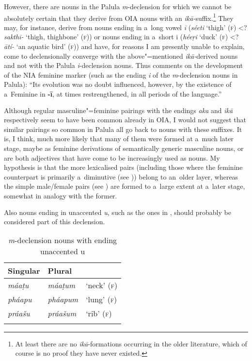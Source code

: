 However, there are nouns in the Palula \textit{m}-declension for which we cannot be absolutely
certain that they derive from OIA nouns with an \textit{ikā-}suffix.\footnote{At least there are
  no \textit{ikā}-formations occurring in the older literature, which of course is no proof
  they have never existed.} They may, for instance, derive from nouns ending in a~long vowel
\textit{ī} (\textit{séeti} `thigh' (\textsc{f}) {\textless}? \textit{sakthī-} `thigh, thighbone' (\textsc{f})) or nouns ending in a~short i (\textit{héeṛi} `duck'
(\textsc{f}) {\textless}? \textit{ātí-} `an aquatic bird' (\textsc{f})) and have, for
reasons I am presently unable to explain, come to declensionally converge with the above"=mentioned
\textit{ikā-}derived nouns and not with the Palula \textit{i}-declension nouns. Thus
\citet[222]{masica1991} comments on the development of the NIA feminine marker (such as the ending
\textit{i} of the \textit{m}-declension nouns in Palula): ``Its evolution was no doubt influenced,
however, by the existence of a~Feminine in \textbf{-ī}, at times
restrengthened, in all periods of the language.''


Although regular masculine"=feminine pairings with the endings \textit{aka} and \textit{ikā}
respectively seem to have been common already in OIA, I would not suggest that similar pairings so
common in Palula all go back to nouns with these suffixes. It is, I think, much more likely that
many of them were formed at a~much later stage, maybe as feminine derivations of semantically
generic masculine nouns, or are both adjectives that have come to be increasingly used as nouns. My
hypothesis is that the more lexicalised pairs (including those where the feminine counterpart is
primarily a~diminutive (see )) belong to an~older layer, whereas the simple
male/female pairs (see ) are formed to a~large extent at a~later stage, somewhat in
analogy with the former.


Also nouns ending in unaccented \textit{u}, such as the ones in , should probably be considered part of this declension. 



\begin{table}[ht]
\caption{\textit{m}-declension nouns with ending unaccented u}
\begin{tabularx}{\textwidth}{ Q Q Q }
\lsptoprule
Singular &
Plural &
\\\hline
\textit{máaṭu} &
\textit{máaṭum} &
`neck' (\textsc{f})\\
\textit{pháapu} &
\textit{pháapum} &
`lung' (\textsc{f})\\
\textit{práašu} &
\textit{práašum} &
`rib' (\textsc{f})\\\lspbottomrule
\end{tabularx}
\label{tab:4-17}
\end{table}

